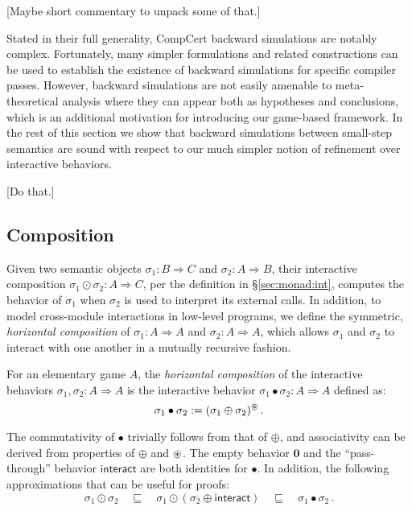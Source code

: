 \documentclass[acmsmall,timestamp,review]{acmart}
\newcommand{\kw}[1]{\ensuremath{ \mathsf{#1} }}
\begin{document}
[Maybe short commentary to unpack some of that.]

Stated in their full generality,
CompCert backward simulations are notably complex.
Fortunately,
many simpler formulations and related constructions
can be used to establish
the existence of backward simulations
for specific compiler passes.
However,
backward simulations are not easily amenable to
meta-theoretical analysis
where they can appear both as hypotheses and conclusions,
which is an additional motivation for introducing
our game-based framework.
In the rest of this section we show that
backward simulations between small-step semantics
are sound with respect to
our much simpler notion of refinement
over interactive behaviors.

[Do that.]


\subsection{Composition} \label{sec:modsem:comp} %

Given two semantic objects
$\sigma_1 : B \Rightarrow C$ and
$\sigma_2 : A \Rightarrow B$,
their interactive composition $\sigma_1 \odot \sigma_2 : A \Rightarrow C$,
per the definition in \S\ref{sec:monad:int},
computes the behavior of $\sigma_1$ when $\sigma_2$ is used
to interpret its external calls.
In addition,
to model cross-module interactions in low-level programs,
we define the symmetric,
\emph{horizontal composition}
of
$\sigma_1 : A \Rightarrow A$ and
$\sigma_2 : A \Rightarrow A$,
which allows $\sigma_1$ and $\sigma_2$
to interact with one another
in a mutually recursive fashion.

\begin{definition}
For an elementary game $A$,
the \emph{horizontal composition} of the interactive behaviors
$\sigma_1, \sigma_2 : A \Rightarrow A$
is the interactive behavior
$\sigma_1 \bullet \sigma_2 : A \Rightarrow A$
defined as:
\[
    \sigma_1 \bullet \sigma_2 :=
      (\sigma_1 \oplus \sigma_2)^\oast \,.
\]
\end{definition}

The commutativity of $\bullet$ trivially follows from that of $\oplus$,
and associativity can be derived from properties of $\oplus$ and $\oast$.
The empty behavior $\mathbf{0}$ and
the ``pass-through'' behavior $\kw{interact}$
are both identities for $\bullet$.
In addition,
the following approximations that can be useful for proofs:
\[
    \sigma_1 \odot \sigma_2 \quad \sqsubseteq \quad
    \sigma_1 \odot (\sigma_2 \oplus \kw{interact}) \quad \sqsubseteq \quad
    \sigma_1 \bullet \sigma_2 \,.
\]
\end{document}
